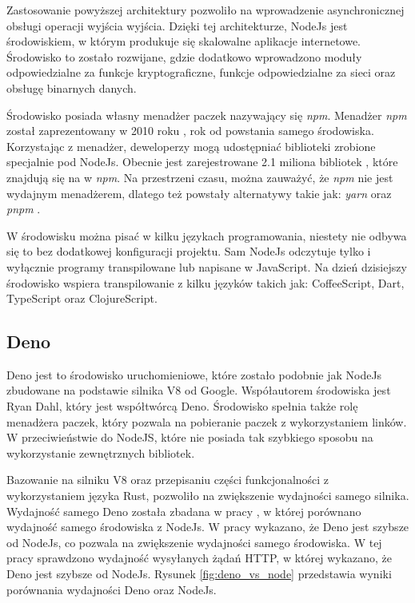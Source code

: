 Zastosowanie powyższej architektury pozwoliło na wprowadzenie asynchronicznej obsługi operacji wyjścia wyjścia. Dzięki tej architekturze, NodeJs jest środowiskiem, w którym produkuje się skalowalne aplikacje internetowe. Środowisko to zostało rozwijane, gdzie dodatkowo wprowadzono moduły odpowiedzialne za funkcje kryptograficzne, funkcje odpowiedzialne za sieci oraz obsługę binarnych danych.

Środowisko posiada własny menadżer paczek nazywający się \textit{npm}. Menadżer \textit{npm} został zaprezentowany w 2010 roku \cite{npm}, rok od powstania samego środowiska. Korzystając z menadżer, deweloperzy mogą udostępniać biblioteki zrobione specjalnie pod NodeJs. Obecnie jest zarejestrowane 2.1 miliona bibliotek \cite{npm}, które znajdują się na w \textit{npm}. Na przestrzeni czasu, można zauważyć, że \textit{npm} nie jest wydajnym menadżerem, dlatego też powstały alternatywy takie jak: \textit{yarn} \cite{yarn} oraz \textit{pnpm} \cite{pnpm}. 

W środowisku można pisać w kilku językach programowania, niestety nie odbywa się to bez dodatkowej konfiguracji projektu. Sam NodeJs odczytuje tylko i wyłącznie programy transpilowane lub napisane w JavaScript. Na dzień dzisiejszy środowisko wspiera transpilowanie z kilku języków takich jak: CoffeeScript, Dart, TypeScript oraz ClojureScript.

\subsection{Deno}
Deno jest to środowisko uruchomieniowe, które zostało podobnie jak NodeJs zbudowane na podstawie silnika V8 od Google. Współautorem środowiska jest Ryan Dahl, który jest współtwórcą Deno. Środowisko spełnia także rolę menadżera paczek, który pozwala na pobieranie paczek z wykorzystaniem linków. W przeciwieństwie do NodeJS, które nie posiada tak szybkiego sposobu na wykorzystanie zewnętrznych bibliotek.

Bazowanie na silniku V8 oraz przepisaniu części funkcjonalności z wykorzystaniem języka Rust, pozwoliło na zwiększenie wydajności samego silnika. Wydajność samego Deno została zbadana w pracy \cite{deno_performance}, w której porównano wydajność samego środowiska z NodeJs. W pracy wykazano, że Deno jest szybsze od NodeJs, co pozwala na zwiększenie wydajności samego środowiska. W tej pracy sprawdzono wydajność wysyłanych żądań HTTP, w której wykazano, że Deno jest szybsze od NodeJs. Rysunek \ref{fig:deno_vs_node} przedstawia wyniki porównania wydajności Deno oraz NodeJs.

